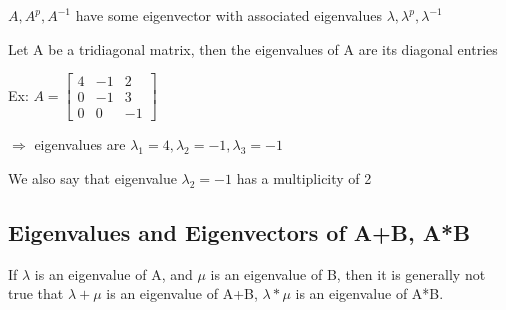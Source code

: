 \documentclass[12pt]{amsart}
\numberwithin{equation}{theorem}    %
\begin{document}
$A, A^p, A^{-1}$ have some eigenvector with associated eigenvalues $\lambda, \lambda^p, \lambda^{-1}$

Let A be a tridiagonal matrix, then the eigenvalues of A are its diagonal entries

Ex: $A = \begin{bmatrix}
        4 & -1 & 2  \\
        0 & -1 & 3  \\
        0 & 0  & -1
    \end{bmatrix}$

$\Rightarrow$ eigenvalues are $\lambda_1 = 4, \lambda_2 = -1, \lambda_3 = -1$

We also say that eigenvalue $\lambda_2=-1$ has a multiplicity of 2

\subsection{Eigenvalues and Eigenvectors of A+B, A*B}

If $\lambda$ is an eigenvalue of A, and $\mu$ is an eigenvalue of B, then it is generally not true that $\lambda + \mu$ is an eigenvalue of A+B, $\lambda * \mu$ is an eigenvalue of A*B.
\end{document}
